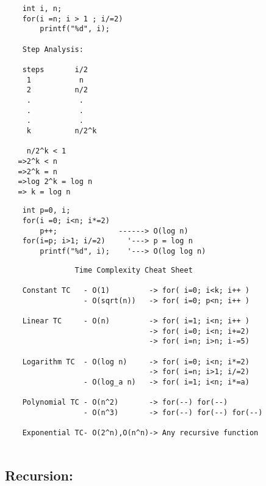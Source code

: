 \documentclass{article}
\begin{document}
\hrulefill
\begin{verbatim}
    int i, n;
    for(i =n; i > 1 ; i/=2)
        printf("%d", i);

    Step Analysis:
    
    steps       i/2
     1           n
     2          n/2
     .           .
     .           .
     .           .
     k          n/2^k  

     n/2^k < 1
   =>2^k < n
   =>2^k = n
   =>log 2^k = log n
   => k = log n
\end{verbatim}
\hrulefill
\begin{verbatim}
    int p=0, i;
    for(i =0; i<n; i*=2)
        p++;              ------> O(log n)
    for(i=p; i>1; i/=2)     '---> p = log n
        printf("%d", i);    '---> O(log log n)
\end{verbatim}
\hrulefill
\newpage
\hrulefill
\begin{verbatim}
                Time Complexity Cheat Sheet
                
    Constant TC   - O(1)         -> for( i=0; i<k; i++ )
                  - O(sqrt(n))   -> for( i=0; p<n; i++ )

    Linear TC     - O(n)         -> for( i=1; i<n; i++ )
                                 -> for( i=0; i<n; i+=2)
                                 -> for( i=n; i>n; i-=5)

    Logarithm TC  - O(log n)     -> for( i=0; i<n; i*=2)
                                 -> for( i=n; i>1; i/=2)
                  - O(log_a n)   -> for( i=1; i<n; i*=a)

    Polynomial TC - O(n^2)       -> for(--) for(--)
                  - O(n^3)       -> for(--) for(--) for(--)

    Exponential TC- O(2^n),O(n^n)-> Any recursive function
 
\end{verbatim}
\hrulefill

\subsection*{Recursion:}
\end{document}
